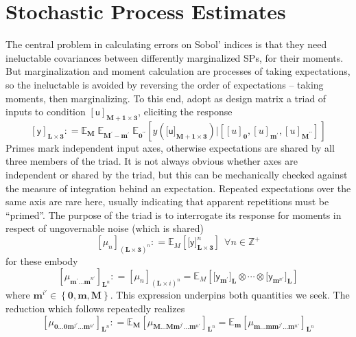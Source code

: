 \documentclass[preprint,12pt]{elsarticle}
\newcommand*{\M}[1]{\ensuremath{#1}\xspace}
\newcommand*{\x}{\times}
\newcommand*{\mi}[1]{\mathbf{#1}}
\newcommand*{\st}[1]{\mathbb{#1}}
\newcommand*{\rv}[1]{\mathsf{#1}}
\newcommand*{\te}[2][]{\left\lbrack{#2}\right\rbrack_{#1}}
\newcommand*{\tte}[2][]{\lbrack{#2}\rbrack_{#1}}
\newcommand*{\deq}{\M{\mathrel{\mathop:}=}}
\newcommand*{\ev}[3][]{\mathbb{E}_{#3}^{#1}\!\left\lbrack{#2}\right\rbrack}
\newcommand*{\evt}[3][]{\mathbb{E}_{#3}^{#1}\!#2}
\newcommand*{\set}[1]{\M{\left\lbrace{#1}\right\rbrace}}
\begin{document}
\section{Stochastic Process Estimates}\label{sec:SPEst}
    The central problem in calculating errors on Sobol' indices is that they need ineluctable covariances between differently marginalized SPs, for their moments. But marginalization and moment calculation are processes of taking expectations, so the ineluctable is avoided by reversing the order of expectations -- taking moments, then marginalizing.
    To this end, adopt as design matrix a triad of inputs to condition $\te[\mi{M+1\x 3}]{\rv{u}}$, eliciting the response
    \begin{equation}\label{def:SPEst:y}
        \te[\mi{L\x 3}]{\rv{y}} \deq 
        \evt{\;\evt{\;\ev{y(\tte[\mi{M+1\x 3}]{\rv{u}}) 
            \big\vert \te[]{\te[\mi{0}]{u}, \te[\mi{m^{\prime}}]{u}, \te[\mi{M^{\prime\prime}}]{u}}}{\mi{0^{\prime\prime}}}}
        {\mi{M^{\prime}-m^{\prime}}}}{\mi{M}}
    \end{equation}
    Primes mark independent input axes, otherwise expectations are shared by all three members of the triad. It is not always obvious whether axes are independent or shared by the triad, but this can be mechanically checked against the measure of integration behind an expectation. Repeated expectations over the same axis are rare here, usually indicating that apparent repetitions must be ``primed''. The purpose of the triad is to interrogate its response for moments in respect of ungovernable noise (which is shared)
    \begin{equation}\label{def:SPEst:mu}
            \te[(\mi{L\x 3})^{n}]{\mu_{n}} \deq \ev{\tte[\mi{L\x 3}]{\rv{y}}^{n}}{M} \ \ \forall n \in \st{Z}^{+}
    \end{equation}
    for these embody
    \begin{equation*}
        \te[\mi{L}^{n}]{\mu_{\mi{m^{\prime}\ldots m}^{n\prime}}} \deq \te[(\mi{L\x}i)^{n}]{\mu_{n}} = \ev{\tte[\mi{L}]{\rv{y}_{\mi{m}^{\prime}}}\otimes\cdots\otimes\tte[\mi{L}]{\rv{y}_{\mi{m}^{n\prime}}}}{M}
    \end{equation*}
    where $\mi{m}^{i\prime} \in \set{\mi{0},\mi{m},\mi{M}}$. This expression underpins both quantities we seek. The reduction which follows repeatedly realizes
    \begin{equation}\label{eq:SPEstimates:reduction}
        \te[\mi{L}^{n}]{\mu_{\mi{0\ldots 0}\mi{m}^{j\prime}\mi{\ldots m}^{n\prime}}} \deq 
        \evt{\te[\mi{L}^{n}]{\mu_{\mi{M\ldots M}\mi{m}^{j\prime}\mi{\ldots m}^{n\prime}}}}{\mi{M}} = 
        \evt{\te[\mi{L}^{n}]{\mu_{\mi{m\ldots m}\mi{m}^{j\prime}\mi{\ldots m}^{n\prime}}}}{\mi{m}}
    \end{equation}
\end{document}
